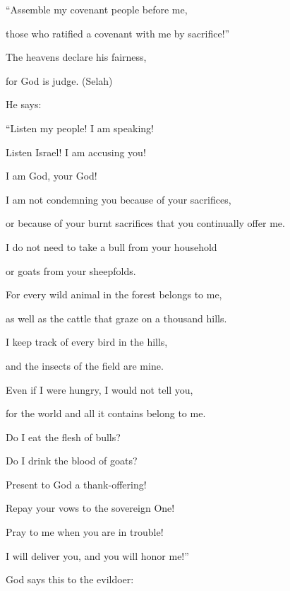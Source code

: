 {\par }{\Q “Assemble
my covenant people
before me,

\par }{\Q those who ratified
a covenant
with me by
sacrifice!”
\par }{\Q {}The heavens
declare
his fairness,
\par }{\Q for
God
is judge.
(Selah)
\par }{\Q {}He says:

\par }{\Q “Listen
my people! I am speaking!
\par }{\Q Listen Israel! I am accusing
you!

\par }{\Q I am
God,
your God!
\par }{\Q {}I am not
condemning
you because of your sacrifices,
\par }{\Q or because of your burnt sacrifices
that you continually offer me.
\par }{\Q {}I do not
need to take
a bull
from your household
\par }{\Q or goats
from your sheepfolds.
\par }{\Q {}For
every
wild animal
in the forest
belongs to me,
\par }{\Q as well as the cattle
that graze on a thousand
hills.
\par }{\Q {}I
keep track
of every
bird
in the hills,
\par }{\Q and the insects
of the field
are mine.
\par }{\Q {}Even if
I were hungry,
I would not
tell
you,
\par }{\Q for
the world
and all it contains belong to me.
\par }{\Q {}Do I eat
the flesh
of bulls?
\par }{\Q Do I drink
the blood
of goats?
\par }{\Q {}Present
to God
a thank-offering!
\par }{\Q Repay
your vows
to the sovereign One!
\par }{\Q {}Pray
to me when
you are in trouble!

\par }{\Q I will deliver
you, and you will honor me!”
\par }{\Q {}God
says
this to the evildoer:

}
